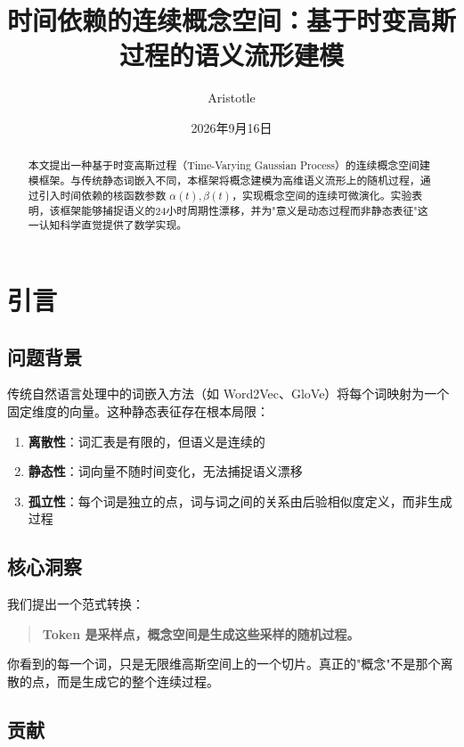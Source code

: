 \documentclass[12pt, a4paper]{article}
\title{\textbf{时间依赖的连续概念空间：基于时变高斯过程的语义流形建模}}
\author{Aristotle}
\date{2026年9月16日}
\begin{document}
\maketitle

\begin{abstract}
本文提出一种基于时变高斯过程（Time-Varying Gaussian Process）的连续概念空间建模框架。与传统静态词嵌入不同，本框架将概念建模为高维语义流形上的随机过程，通过引入时间依赖的核函数参数 $\alpha(t), \beta(t)$，实现概念空间的连续可微演化。实验表明，该框架能够捕捉语义的24小时周期性漂移，并为"意义是动态过程而非静态表征"这一认知科学直觉提供了数学实现。
\end{abstract}

\section{引言}

\subsection{问题背景}

传统自然语言处理中的词嵌入方法（如 Word2Vec、GloVe）将每个词映射为一个固定维度的向量。这种静态表征存在根本局限：

\begin{enumerate}
    \item \textbf{离散性}：词汇表是有限的，但语义是连续的
    \item \textbf{静态性}：词向量不随时间变化，无法捕捉语义漂移
    \item \textbf{孤立性}：每个词是独立的点，词与词之间的关系由后验相似度定义，而非生成过程
\end{enumerate}

\subsection{核心洞察}

我们提出一个范式转换：

\begin{quote}
\textbf{Token 是采样点，概念空间是生成这些采样的随机过程。}
\end{quote}

你看到的每一个词，只是无限维高斯空间上的一个切片。真正的"概念"不是那个离散的点，而是生成它的整个连续过程。

\subsection{贡献}
\end{document}
